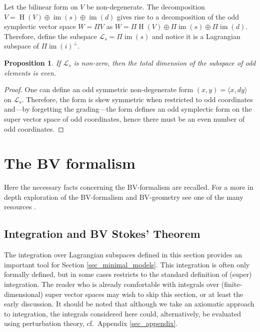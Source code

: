 \documentclass[]{amsart}
\newtheorem{proposition}[theorem]{Proposition}
\theoremstyle{definition}
\newcommand{\im}{\operatorname{im}}
\newcommand{\homology}{\operatorname{H}}
\begin{document}
Let the bilinear form on $V$ be non-degenerate. The decomposition $V=\homology (V) \oplus \im(s) \oplus \im(d)$ gives rise to a decomposition of the odd symplectic vector space $W=\Pi V$ as $W=\Pi \homology (V) \oplus \Pi \im(s) \oplus \Pi \im(d)$. Therefore, define the subspace $\mathcal{L}_s=\Pi \im(s)$ and notice it is a Lagrangian subspace of $\Pi \im(i)^\perp$.

\begin{proposition}\label{prop_lagrangian_has_even_number_of_odd}
If $\mathcal{L}_s$ is non-zero, then the total dimension of the subspace of odd elements is even.
\end{proposition}
\begin{proof}
One can define an odd symmetric non-degenerate form $(x,y)=\langle x, dy \rangle$ on $\mathcal{L}_s$. Therefore, the form is skew symmetric when restricted to odd coordinates and---by forgetting the grading---the form defines an odd symplectic form on the super vector space of odd coordinates, hence there must be an even number of odd coordinates.
\end{proof}

\section{The BV formalism}\label{sec_bv}

Here the necessary facts concerning the BV-formalism are recalled. For a more in depth exploration of the BV-formalism and BV-geometry see one of the many resources \cite{batalin_vilkovisky_gauge_algebra_quantization,batalin_vilkovisky_quantization_of_gauge_algebras,costello,khudaverdian_semidensities,khudaverdian_geometry_of_superspace,khudaverdian_BV_and_odd_symp_geo,
khudaverdian_nersessian,intro_to_graded_geo_BV_formalism_and_applications,schwarz,severa}.

\subsection{Integration and BV Stokes' Theorem}\label{sec_integration}

The integration over Lagrangian subspaces defined in this section provides an important tool for Section \ref{sec_minimal_models}. This integration is often only formally defined, but in some cases restricts to the standard definition of (super) integration. The reader who is already comfortable with integrals over (finite-dimensional) super vector spaces may wish to skip this section, or at least the early discussion. It should be noted that although we take an axiomatic approach to integration, the integrals considered here could, alternatively, be evaluated using perturbation theory, cf.~Appendix \ref{sec_appendix}.
\end{document}

